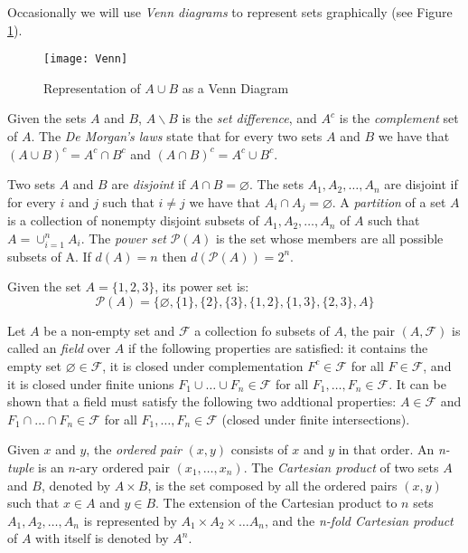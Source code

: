 Occasionally we will use \emph{Venn diagrams} to represent sets graphically (see Figure \ref{fig:Venn-diagram}).

\begin{figure}[h]
\centering\texttt{[image: Venn]}
\caption{\label{fig:Venn-diagram}Representation of $A \cup B$ as a Venn Diagram}
\end{figure}

Given the sets $A$ and $B$, $A \backslash B$ is the \emph{set difference}, and ${A}^c$ is the \emph{complement} set of $A$. The \emph{De Morgan's laws} state that for every two sets $A$ and $B$ we have that $\left( A \cup B \right)^c = A^c \cap B^c$ and $\left( A \cap B \right)^c = A^c \cup B^c$.

Two sets $A$ and $B$ are \emph{disjoint} if $A \cap B = \varnothing$. The sets $A_1, A_2, \ldots, A_n$ are disjoint if for every $i$ and $j$ such that $i \neq j$ we have that $A_i \cap A_j = \varnothing$. A \emph{partition} of a set $A$ is a collection of nonempty disjoint subsets of $A_1, A_2, \dots, A_n$ of $A$ such that  $A = \cup_{i=1}^n A_i$. The \emph{power set} $\mathcal{P}(A)$ is the set whose members are all possible subsets of A. If $d(A)=n$ then $d\left( \mathcal{P}(A) \right) = 2^n$.

\begin{example}
Given the set $A = \{1, 2, 3\}$, its power set is:
\[
\mathcal{P}(A) = \{\varnothing, \{1\}, \{2\}, \{3\}, \{1,2\}, \{1,3\}, \{2,3\}, A\}
\]
\end{example}

Let $A$ be a non-empty set and $\mathcal{F}$ a collection fo subsets of $A$, the pair $\left( A, \mathcal{F} \right)$ is called an \emph{field} over $A$ if the following properties are satisfied: it contains the empty set $\varnothing \in \mathcal{F}$, it is closed under complementation $F^c  \in \mathcal{F}$ for all $F \in \mathcal{F}$, and it is closed under finite unions $F_1 \cup \ldots \cup F_n  \in \mathcal{F}$ for all $F_1, \ldots, F_n \in \mathcal{F}$. It can be shown that a field must satisfy the following two addtional properties: $A \in \mathcal{F}$ and $F_1 \cap \ldots \cap F_n  \in \mathcal{F}$ for all $F_1, \ldots, F_n \in \mathcal{F}$ (closed under finite intersections).


Given $x$ and $y$, the \emph{ordered pair} $\left(x, y\right)$ consists of $x$ and $y$ in that order. An \emph{n-tuple} is an $n$-ary ordered pair $\left( x_1, \ldots, x_n \right)$. The \emph{Cartesian product} of two sets $A$ and $B$, denoted by $A \times B$, is the set composed by all the ordered pairs $\left(x, y\right)$ such that $x \in A$ and $y \in B$. The extension of the Cartesian product to $n$ sets $A_1, A_2, \dots, A_n$ is represented by $A_1 \times A_2 \times \dots A_n$, and the \emph{n-fold Cartesian product} of $A$ with itself is denoted by $A^n$.

